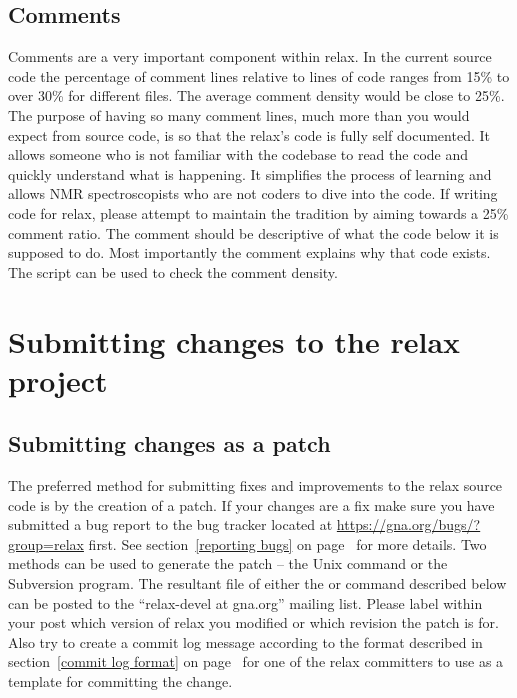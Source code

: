 \subsection{Comments}

Comments are a very important component within relax.
In the current source code the percentage of comment lines relative to lines of code ranges from 15\% to over 30\% for different files.
The average comment density would be close to 25\%.
The purpose of having so many comment lines, much more than you would expect from source code, is so that the relax's code is fully self documented.
It allows someone who is not familiar with the codebase to read the code and quickly understand what is happening.
It simplifies the process of learning and allows NMR spectroscopists who are not coders to dive into the code.
If writing code for relax, please attempt to maintain the tradition by aiming towards a 25\% comment ratio.
The comment should be descriptive of what the code below it is supposed to do.
Most importantly the comment explains why that code exists.
The script  can be used to check the comment density.




\section{Submitting changes to the relax project}


\subsection{Submitting changes as a patch}

The preferred method for submitting fixes and improvements to the relax source code is by the creation of a patch.
If your changes are a fix make sure you have submitted a bug report to the bug tracker located at \href{https://gna.org/bugs/?group=relax}{https://gna.org/bugs/?group=relax} first.
See section~\ref{reporting bugs} on page~\pageref{reporting bugs} for more details.
Two methods can be used to generate the patch -- the Unix command  or the Subversion program.
The resultant file  of either the  or  command described below can be posted to the ``relax-devel at gna.org'' mailing list.
Please label within your post which version of relax you modified or which revision the patch is for.
Also try to create a commit log message according to the format described in section~\ref{commit log format} on page~\pageref{commit log format} for one of the relax committers to use as a template for committing the change.



